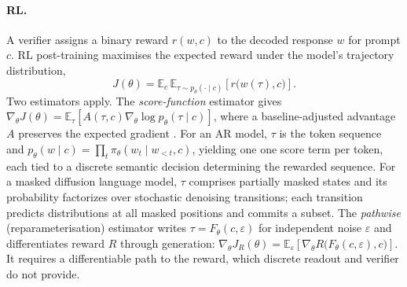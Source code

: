 \paragraph{RL.}
A verifier assigns a binary reward $r(w,c)$ to the decoded response $w$ for prompt $c$. RL post-training maximises the expected reward under the model's trajectory distribution,
\begin{equation}
J(\theta)=\mathbb E_c\,\mathbb E_{\tau\sim p_\theta(\cdot\mid c)}\!\left[r\bigl(w(\tau),c\bigr)\right].
\label{eq:objective}
\end{equation}
Two estimators apply. The \emph{score-function} estimator gives $\nabla_\theta J(\theta)=\mathbb E_\tau\left[A(\tau,c)\nabla_\theta\log p_\theta(\tau\mid c)\right]$, where a baseline-adjusted advantage $A$ preserves the expected gradient \citep{williams1992reinforce}. For an AR model, $\tau$ is the token sequence and $p_\theta(w\mid c)=\prod_t\pi_\theta(w_t\mid w_{<t},c)$, yielding one one score term per token, each tied to a discrete semantic decision determining the rewarded sequence. For a masked diffusion language model, $\tau$ comprises partially masked states and its probability factorizes over stochastic denoising transitions; each transition predicts distributions at all masked positions and commits a subset. The \emph{pathwise} (reparameterisation) estimator writes $\tau=F_\theta(c,\varepsilon)$ for independent noise $\varepsilon$ and differentiates reward $R$ through generation: $\nabla_\theta J_R(\theta)=\mathbb E_\varepsilon\left[\nabla_\theta R\bigl(F_\theta(c,\varepsilon),c\bigr)\right]$. It requires a differentiable path to the reward, which discrete readout and verifier do not provide.


